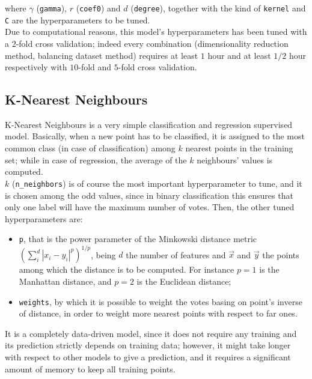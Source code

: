 \documentclass[letterpaper]{article}
\begin{document}
	where $\gamma$ (\texttt{gamma}), $r$ (\texttt{coef0}) and $d$ (\texttt{degree}), together with the kind of \texttt{kernel} and \texttt{C} are the hyperparameters to be tuned.\\
	Due to computational reasons, this model's hyperparameters has been tuned with a $2$-fold cross validation; indeed every combination (dimensionality reduction method, balancing dataset method) requires at least $1$ hour and at least $1/2$ hour respectively with $10$-fold and $5$-fold cross validation.
	
	\subsection{K-Nearest Neighbours}
	K-Nearest Neighbours is a very simple classification and regression supervised model. Basically, when a new point has to be classified, it is assigned to the most common class (in case of classification) among $k$ nearest points in the training set; while in case of regression, the average of the $k$ neighbours' values is computed. \\ 
	$k$ (\texttt{n\_neighbors}) is of course the most important hyperparameter to tune, and it is chosen among the odd values, since in binary classification this ensures that only one label will have the maximum number of votes. Then, the other tuned hyperparameters are:
	\begin{itemize}
		\item \texttt{p}, that is the power parameter of the Minkowski distance metric $(\sum_{i}^{d}| x_i- y_i|^p)^{1/p}$, being $d$ the number of features and $\vec{x}$ and $\vec{y}$ the points among which the distance is to be computed. For instance $p=1$ is the Manhattan distance, and $p=2$ is the Euclidean distance;
		\item \texttt{weights}, by which it is possible to weight the votes basing on point's inverse of distance, in order to weight more nearest points with respect to far ones.
	\end{itemize}
	It is a completely data-driven model, since it does not require any training and its prediction strictly depends on training data; however, it might take longer with respect to other models to give a prediction, and it requires a significant amount of memory to keep all training points.
\end{document}

